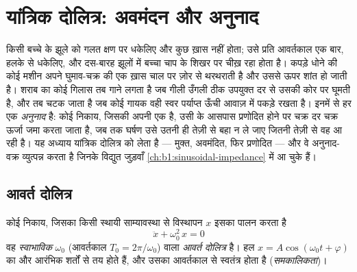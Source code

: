 \chapter{यांत्रिक दोलित्र: अवमंदन और अनुनाद}\label{ch:b1:oscillators-resonance}

किसी बच्चे के झूले को गलत क्षण पर धकेलिए और कुछ ख़ास नहीं होता; उसे प्रति
आवर्तकाल एक बार, हलके से धकेलिए, और दस-बारह झूलों में बच्चा चाप के शिखर पर
चीख़ रहा होता है। कपड़े धोने की कोई मशीन अपने घुमाव-चक्र की एक ख़ास चाल पर
ज़ोर से थरथराती है और उससे ऊपर शांत हो जाती है। शराब का कोई गिलास तब गाने
लगता है जब गीली उँगली ठीक उपयुक्त दर से उसकी कोर पर घूमती है, और तब चटक
जाता है जब कोई गायक वही स्वर पर्याप्त ऊँची आवाज़ में पकड़े रखता है। इनमें
से हर एक \emph{अनुनाद} है: कोई निकाय, जिसकी अपनी एक  है,
उसी के आसपास प्रणोदित होने पर चक्र दर चक्र ऊर्जा जमा करता जाता है, जब तक
घर्षण उसे उतनी ही तेज़ी से बहा न ले जाए जितनी तेज़ी से वह आ रही है। यह
अध्याय यांत्रिक दोलित्र को लेता है --- मुक्त, अवमंदित, फिर प्रणोदित --- और
वे अनुनाद-वक्र व्युत्पन्न करता है जिनके विद्युत जुड़वाँ
\cref{ch:b1:sinusoidal-impedance} में आ चुके हैं।

\section{आवर्त दोलित्र}

\begin{definition}[आवर्त दोलित्र]\label{def:b1:oscillators-resonance:harmonic}
कोई निकाय, जिसका किसी स्थायी साम्यावस्था से विस्थापन $x$ इसका पालन करता है
\[
\ddot x + \omega_0^2\,x = 0
\]
वह \emph{स्वाभाविक } $\omega_0$ (आवर्तकाल
$T_0 = 2\pi/\omega_0$) वाला \emph{आवर्त दोलित्र} है। हल $x = A\cos(\omega_0t
+ \varphi)$ का  और  आरंभिक शर्तों से तय होते हैं, और उसका आवर्तकाल
 से स्वतंत्र होता है (\emph{समकालिकता})।
\end{definition}

